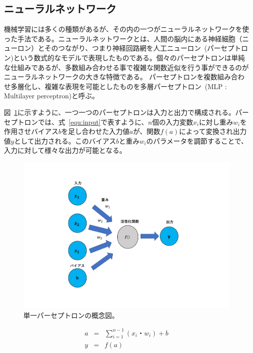 \subsection{ニューラルネットワーク}
機械学習には多くの種類があるが、その内の一つがニューラルネットワークを使った手法である。ニューラルネットワークとは、人間の脳内にある神経細胞（ニューロン）とそのつながり、つまり神経回路網を人工ニューロン~(パーセプトロン)という数式的なモデルで表現したものである。個々のパーセプトロンは単純な仕組みであるが、多数組み合わせる事で複雑な関数近似を行う事ができるのがニューラルネットワークの大きな特徴である。
パーセプトロンを複数組み合わせ多層化し、複雑な表現を可能としたものを多層パーセプトロン~(MLP : Multilayer perceptron)と呼ぶ。

図~\ref{fig:perce}に示すように、一つ一つのパーセプトロンは入力と出力で構成される。パーセプトロンでは、式~\eqref{equ:input}で表すように、$n$個の入力変数$x_i$に対し重み$w_i$を作用させバイアス$b$を足し合わせた入力値$a$が、関数$f(a)$によって変換され出力値$y$として出力される。このバイアス$b$と重み$w_i$のパラメータを調節することで、入力に対して様々な出力が可能となる。
\begin{figure}[tb]
  \centering
  \vspace{-3cm}
  \includegraphics[clip, width=15cm]{fig/4/parceptron.pdf}
  \vspace{-2cm}
  \caption{単一パーセプトロンの概念図。}
  \label{fig:perce}
\end{figure}
\begin{eqnarray}
    a &=& \sum^{n-1}_{i=1}(x_i・w_i) + b \label{equ:input}\\
    y &=& f(a)\label{equ:activation}
\end{eqnarray}
